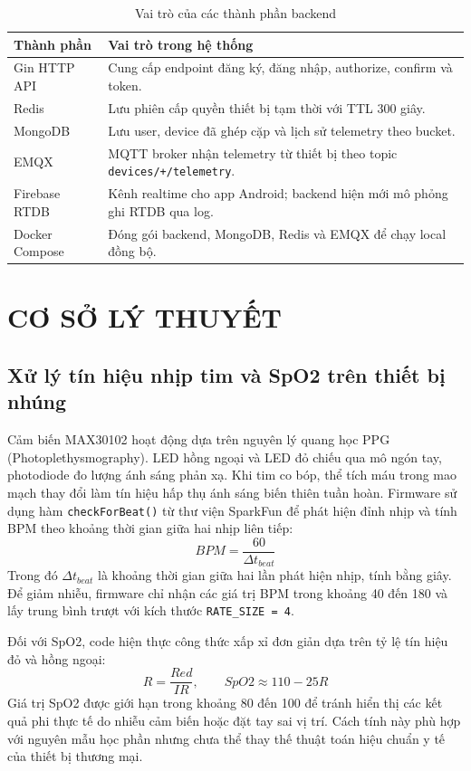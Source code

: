 \documentclass[a4paper,13pt,3p,oneside]{report}
\begin{document}
\begin{table}[H]
\centering
\caption{Vai trò của các thành phần backend}
\begin{tabular}{p{4cm}p{10cm}}
\toprule
\textbf{Thành phần} & \textbf{Vai trò trong hệ thống} \\
\midrule
Gin HTTP API & Cung cấp endpoint đăng ký, đăng nhập, authorize, confirm và token. \\
Redis & Lưu phiên cấp quyền thiết bị tạm thời với TTL 300 giây. \\
MongoDB & Lưu user, device đã ghép cặp và lịch sử telemetry theo bucket. \\
EMQX & MQTT broker nhận telemetry từ thiết bị theo topic \texttt{devices/+/telemetry}. \\
Firebase RTDB & Kênh realtime cho app Android; backend hiện mới mô phỏng ghi RTDB qua log. \\
Docker Compose & Đóng gói backend, MongoDB, Redis và EMQX để chạy local đồng bộ. \\
\bottomrule
\end{tabular}
\end{table}

\chapter{CƠ SỞ LÝ THUYẾT}
\section{Xử lý tín hiệu nhịp tim và SpO2 trên thiết bị nhúng}
Cảm biến MAX30102 hoạt động dựa trên nguyên lý quang học PPG (Photoplethysmography). LED hồng ngoại và LED đỏ chiếu qua mô ngón tay, photodiode đo lượng ánh sáng phản xạ. Khi tim co bóp, thể tích máu trong mao mạch thay đổi làm tín hiệu hấp thụ ánh sáng biến thiên tuần hoàn. Firmware sử dụng hàm \texttt{checkForBeat()} từ thư viện SparkFun để phát hiện đỉnh nhịp và tính BPM theo khoảng thời gian giữa hai nhịp liên tiếp:
\begin{equation}
BPM = \frac{60}{\Delta t_{beat}}
\end{equation}
Trong đó $\Delta t_{beat}$ là khoảng thời gian giữa hai lần phát hiện nhịp, tính bằng giây. Để giảm nhiễu, firmware chỉ nhận các giá trị BPM trong khoảng 40 đến 180 và lấy trung bình trượt với kích thước \texttt{RATE\_SIZE = 4}.

Đối với SpO2, code hiện thực công thức xấp xỉ đơn giản dựa trên tỷ lệ tín hiệu đỏ và hồng ngoại:
\begin{equation}
R = \frac{Red}{IR}, \qquad SpO2 \approx 110 - 25R
\end{equation}
Giá trị SpO2 được giới hạn trong khoảng 80 đến 100 để tránh hiển thị các kết quả phi thực tế do nhiễu cảm biến hoặc đặt tay sai vị trí. Cách tính này phù hợp với nguyên mẫu học phần nhưng chưa thể thay thế thuật toán hiệu chuẩn y tế của thiết bị thương mại.
\end{document}
